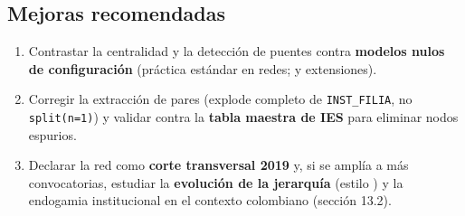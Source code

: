 \subsection{Mejoras recomendadas}

\begin{enumerate}
  \item Contrastar la centralidad y la detección de puentes contra
        \textbf{modelos nulos de configuración} (práctica estándar en redes;
        \citet{newman2001structure} y extensiones).
  \item Corregir la extracción de pares (explode completo de \texttt{INST\_FILIA},
        no \texttt{split(n=1)}) y validar contra la \textbf{tabla maestra de
        IES} para eliminar nodos espurios.
  \item Declarar la red como \textbf{corte transversal 2019} y, si se amplía a
        más convocatorias, estudiar la \textbf{evolución de la jerarquía}
        (estilo \citet{clauset2015systematic}) y la endogamia institucional en
        el contexto colombiano (sección 13.2).
\end{enumerate}
